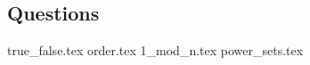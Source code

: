 \documentclass{exam}
\begin{document}
\subsection{Questions}
\begin{questions}
{true_false.tex}
{order.tex}
{1_mod_n.tex}
{power_sets.tex}
\end{questions}


\end{document}
